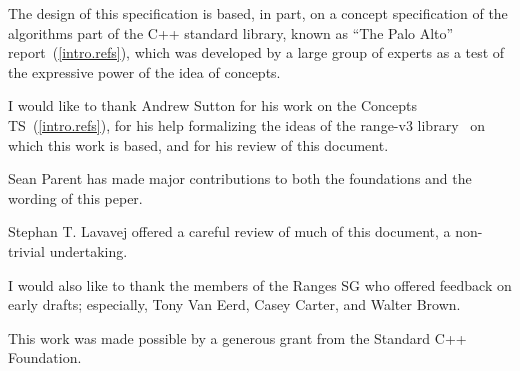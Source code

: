 
The design of this specification is based, in part, on a concept
specification of the algorithms part of the C++ standard library, known
as ``The Palo Alto'' report~(\ref{intro.refs}), which was developed by a large
group of experts as a test of the expressive power of the idea of
concepts.

I would like to thank Andrew Sutton for his work on the Concepts TS~(\ref{intro.refs}),
for his help formalizing the ideas of the range-v3 library~\cite{range-v3} on which this
work is based, and for his review of this document.

Sean Parent has made major contributions to both the foundations and the wording of this
peper.

Stephan T. Lavavej offered a careful review of much of this document, a non-trivial undertaking.

I would also like to thank the members of the Ranges SG who offered feedback on early drafts;
especially, Tony Van Eerd, Casey Carter, and Walter Brown.

This work was made possible by a generous grant from the Standard C++ Foundation.
